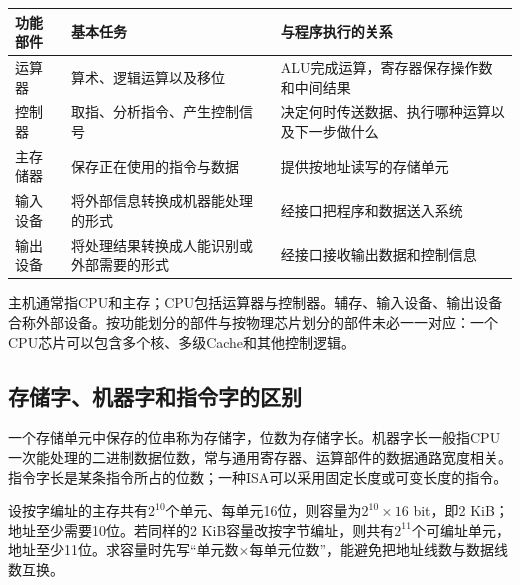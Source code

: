 \par\medskip\noindent\begin{minipage}{\linewidth}\fontsize{9.3}{12}\selectfont\begin{tabularx}{\linewidth}{@{}YYY@{}}
\toprule\noalign{}
\begin{minipage}[b]{\linewidth}\raggedright
功能部件
\end{minipage} & \begin{minipage}[b]{\linewidth}\raggedright
基本任务
\end{minipage} & \begin{minipage}[b]{\linewidth}\raggedright
与程序执行的关系
\end{minipage} \\
\midrule\noalign{}


运算器 & 算术、逻辑运算以及移位 & ALU完成运算，寄存器保存操作数和中间结果 \\
控制器 & 取指、分析指令、产生控制信号 & 决定何时传送数据、执行哪种运算以及下一步做什么 \\
主存储器 & 保存正在使用的指令与数据 & 提供按地址读写的存储单元 \\
输入设备 & 将外部信息转换成机器能处理的形式 & 经接口把程序和数据送入系统 \\
输出设备 & 将处理结果转换成人能识别或外部需要的形式 & 经接口接收输出数据和控制信息 \\
\bottomrule\end{tabularx}
\end{minipage}\par\medskip

主机通常指CPU和主存；CPU包括运算器与控制器。辅存、输入设备、输出设备合称外部设备。按功能划分的部件与按物理芯片划分的部件未必一一对应：一个CPU芯片可以包含多个核、多级Cache和其他控制逻辑。

\subsection{存储字、机器字和指令字的区别}\label{CO01-words}

一个存储单元中保存的位串称为存储字，位数为存储字长。机器字长一般指CPU一次能处理的二进制数据位数，常与通用寄存器、运算部件的数据通路宽度相关。指令字长是某条指令所占的位数；一种ISA可以采用固定长度或可变长度的指令。

设按字编址的主存共有\(2^{10}\)个单元、每单元16位，则容量为\(2^{10}\times16\) bit，即2 KiB；地址至少需要10位。若同样的2 KiB容量改按字节编址，则共有\(2^{11}\)个可编址单元，地址至少11位。求容量时先写“单元数\ensuremath{\times}每单元位数”，能避免把地址线数与数据线数互换。

